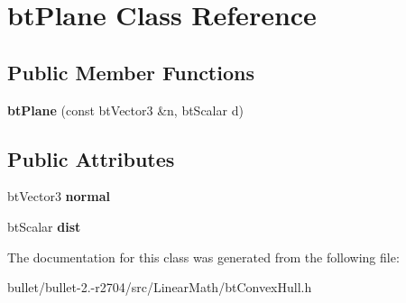 \hypertarget{classbt_plane}{\section{bt\+Plane Class Reference}
\label{classbt_plane}
}
\subsection*{Public Member Functions}
\begin{DoxyCompactItemize}
\item 
\hypertarget{classbt_plane_a4c452dda8a7800e206893a60ad02e75b}{{\bfseries bt\+Plane} (const bt\+Vector3 \&n, bt\+Scalar d)}\label{classbt_plane_a4c452dda8a7800e206893a60ad02e75b}

\end{DoxyCompactItemize}
\subsection*{Public Attributes}
\begin{DoxyCompactItemize}
\item 
\hypertarget{classbt_plane_a770c93299d0961db906151d4810282ca}{bt\+Vector3 {\bfseries normal}}\label{classbt_plane_a770c93299d0961db906151d4810282ca}

\item 
\hypertarget{classbt_plane_aba99698f971610f1e330599ca775fe28}{bt\+Scalar {\bfseries dist}}\label{classbt_plane_aba99698f971610f1e330599ca775fe28}

\end{DoxyCompactItemize}


The documentation for this class was generated from the following file\+:\begin{DoxyCompactItemize}
\item 
bullet/bullet-\/2.-\/r2704/src/\+Linear\+Math/bt\+Convex\+Hull.\+h\end{DoxyCompactItemize}
